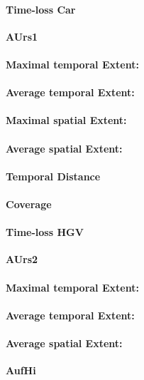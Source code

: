 \begin{table}[ht]
\paragraph{Time-loss Car}

\large
\centerline{\textbf{AUrs1}}
\normalsize

\paragraph{Maximal temporal Extent:}
\paragraph{Average temporal Extent:}
\paragraph{Maximal spatial Extent:}
\paragraph{Average spatial Extent:}
\paragraph{Temporal Distance}
\paragraph{Coverage}
\paragraph{Time-loss HGV}

\large
\centerline{\textbf{AUrs2}}
\normalsize

\paragraph{Maximal temporal Extent:}
\paragraph{Average temporal Extent:}
\paragraph{Average spatial Extent:}

\large
\centerline{\textbf{AufHi}}
\normalsize


\end{table}
